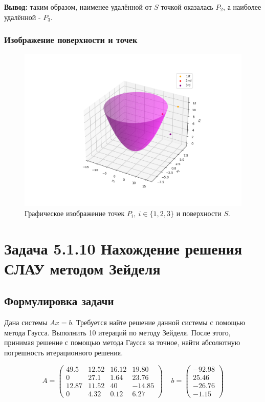 \documentclass[12pt]{article}%
\begin{document}
\textbf{Вывод:} таким образом, наименее удалённой от $S$ точкой оказалась $P_2$, а наиболее удалённой - $P_3$.

\subsubsection{Изображение поверхности и точек}
\newpage
\begin{figure}[h]
    \centering
    \includegraphics[width=0.95\linewidth]{surface_distance.png}
    \caption{Графическое изображение точек $P_i,\ i \in \{1, 2, 3\}$ и поверхности $S$.}
    \label{fig:enter-label}
\end{figure}


\newpage
\section{Задача 5.1.10 Нахождение решения СЛАУ методом Зейделя}
\subsection{Формулировка задачи}

Дана системы $Ax=b$. Требуется найте решение данной системы с помощью метода Гаусса. Выполнить 10 итераций по методу Зейделя. После этого, принимая решение с помощью метода Гаусса за точное, найти абсолютную погрешность итерационного решения.

\begin{equation*}
A = \begin{pmatrix}
    49.5 & 12.52 & 16.12 & 19.80 \\
    0 & 27.1 & 1.64 & 23.76 \\
    12.87 & 11.52 & 40 & -14.85 \\
    0 & 4.32 & 0.12 & 6.27
\end{pmatrix}
\ \ \ \ \
b = \begin{pmatrix}
-92.98 \\ 25.46 \\ -26.76 \\ -1.15
\end{pmatrix}
\end{equation*}
\end{document}
